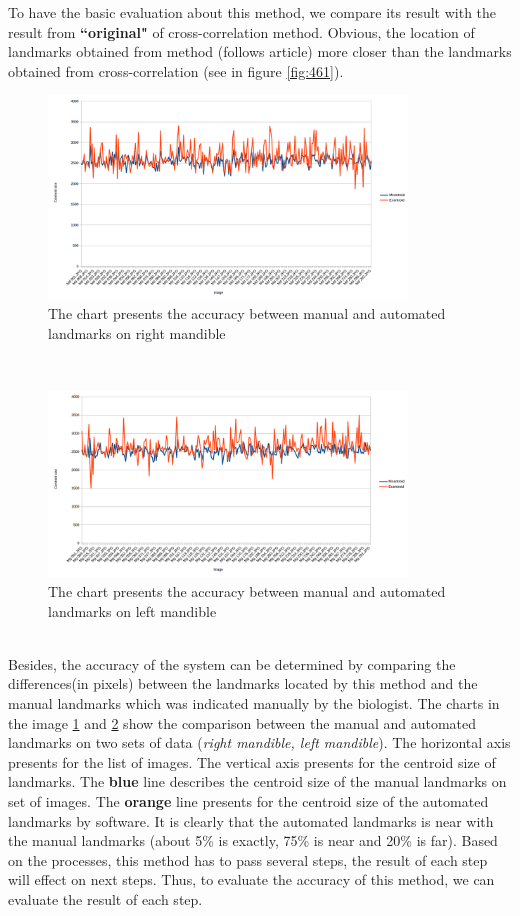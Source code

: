 To have the basic evaluation about this method, we compare its result with the result from \textbf{``original"} of cross-correlation method. Obvious, the location of landmarks obtained from method (follows article) more closer than the landmarks obtained from cross-correlation (see in figure \ref{fig:461}).
\begin{figure}[h!]
\centering
\includegraphics[width=0.85\textwidth]{./images/MdChart}
\caption{The chart presents the accuracy between manual and automated landmarks on right mandible}
\label{fig:47}
\end{figure}~\\
\begin{figure}[h!]
\centering
\includegraphics[width=0.85\textwidth]{./images/MgChart}
\caption{The chart presents the accuracy between manual and automated landmarks on left mandible}
\label{fig:48}
\end{figure}~\\
Besides, the accuracy of the system can be determined by comparing the differences(in pixels) between the landmarks located by this method and the manual landmarks which was indicated manually by the biologist. The charts in the image \ref{fig:47} and \ref{fig:48} show the comparison between the manual and automated landmarks on two sets of data (\textit{right mandible, left mandible}). The horizontal axis presents for the list of images. The vertical axis presents for the centroid size of landmarks. The \textbf{blue} line describes the centroid size of the manual landmarks on set of images. The \textbf{orange} line presents for the centroid size of the automated landmarks by software. It is clearly that the automated landmarks is near with the manual landmarks (about 5\% is exactly, 75\% is near and 20\% is far). Based on the processes, this method has to pass several steps, the result of each step will effect on next steps. Thus, to evaluate the accuracy of this method, we can evaluate the result of each step.
